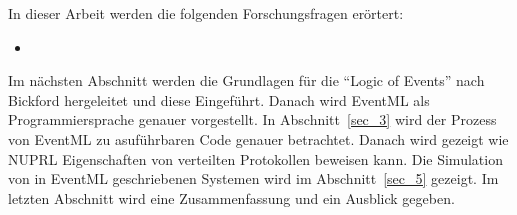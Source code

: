 
In dieser Arbeit werden die folgenden Forschungsfragen erörtert:
\begin{itemize}
  \item 
\end{itemize}


Im nächsten Abschnitt werden die Grundlagen für die ``Logic of Events'' nach
Bickford hergeleitet und diese Eingeführt. Danach wird EventML
als Programmiersprache genauer vorgestellt. In Abschnitt~\ref{sec_3} wird
der Prozess von EventML zu asuführbaren Code genauer betrachtet. Danach wird gezeigt wie
NUPRL Eigenschaften von verteilten Protokollen beweisen kann. Die Simulation
von in EventML geschriebenen Systemen wird im Abschnitt~\ref{sec_5} gezeigt.
Im letzten Abschnitt wird eine Zusammenfassung und ein Ausblick gegeben.
